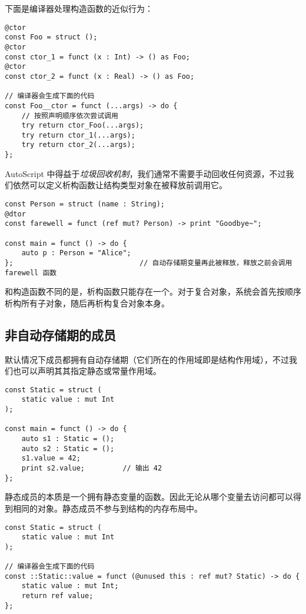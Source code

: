 下面是编译器处理构造函数的近似行为：

\begin{minipage}[c]{0.95\textwidth}
\vspace{1.0em}
\begin{lstlisting}
@ctor
const Foo = struct ();
@ctor
const ctor_1 = funct (x : Int) -> () as Foo;
@ctor
const ctor_2 = funct (x : Real) -> () as Foo;

// 编译器会生成下面的代码
const Foo__ctor = funct (...args) -> do {
	// 按照声明顺序依次尝试调用
    try return ctor_Foo(...args);
    try return ctor_1(...args);
    try return ctor_2(...args);
};
\end{lstlisting}
\end{minipage}

AutoScript 中得益于\emph{垃圾回收机制}，我们通常不需要手动回收任何资源，不过我们依然可以定义析构函数让结构类型对象在被释放前调用它。

\begin{lstlisting}
const Person = struct (name : String); 
@dtor
const farewell = funct (ref mut? Person) -> print "Goodbye~";

const main = funct () -> do {
	auto p : Person = "Alice";
};								// 自动存储期变量再此被释放，释放之前会调用 farewell 函数
\end{lstlisting}

和构造函数不同的是，析构函数只能存在一个。对于复合对象，系统会首先按顺序析构所有子对象，随后再析构复合对象本身。





\subsection{非自动存储期的成员}

默认情况下成员都拥有自动存储期（它们所在的作用域即是结构作用域），不过我们也可以声明其其指定静态或常量作用域。

\begin{lstlisting}
const Static = struct (
	static value : mut Int
);

const main = funct () -> do {
	auto s1 : Static = ();
	auto s2 : Static = ();
	s1.value = 42;
	print s2.value;			// 输出 42
};
\end{lstlisting}

静态成员的本质是一个拥有静态变量的函数。因此无论从哪个变量去访问都可以得到相同的对象。静态成员不参与到结构的内存布局中。

\begin{lstlisting}
const Static = struct (
	static value : mut Int
);

// 编译器会生成下面的代码
const ::Static::value = funct (@unused this : ref mut? Static) -> do {
	static value : mut Int;
	return ref value;
};
\end{lstlisting}

